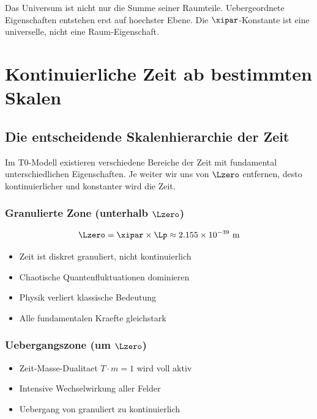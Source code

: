 	Das Universum ist nicht nur die Summe seiner Raumteile. Uebergeordnete Eigenschaften entstehen erst auf hoechster Ebene. Die $\xipar$-Konstante ist eine universelle, nicht eine Raum-Eigenschaft.
	
	\section{Kontinuierliche Zeit ab bestimmten Skalen}
	
	\subsection{Die entscheidende Skalenhierarchie der Zeit}
	
	Im T0-Modell existieren verschiedene Bereiche der Zeit mit fundamental unterschiedlichen Eigenschaften. Je weiter wir uns von $\Lzero$ entfernen, desto kontinuierlicher und konstanter wird die Zeit.
	
	\subsubsection{Granulierte Zone (unterhalb $\Lzero$)}
	
	\begin{equation}
		\Lzero = \xipar \times \Lp \approx 2.155 \times 10^{-39} \text{ m}
	\end{equation}
	
	\begin{itemize}
		\item Zeit ist diskret granuliert, nicht kontinuierlich
		\item Chaotische Quantenfluktuationen dominieren
		\item Physik verliert klassische Bedeutung
		\item Alle fundamentalen Kraefte gleichstark
	\end{itemize}
	
	\subsubsection{Uebergangszone (um $\Lzero$)}
	
	\begin{itemize}
		\item Zeit-Masse-Dualitaet $T \cdot m = 1$ wird voll aktiv
		\item Intensive Wechselwirkung aller Felder
		\item Uebergang von granuliert zu kontinuierlich
	\end{itemize}
	
